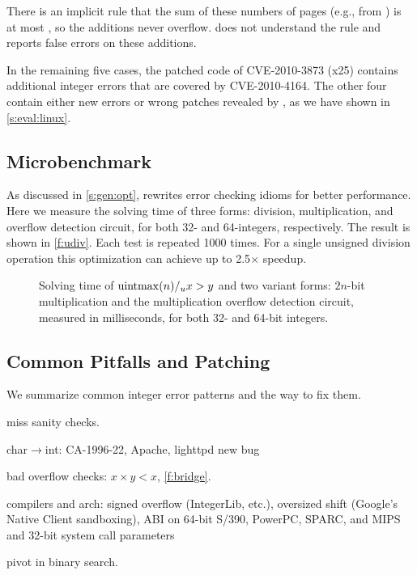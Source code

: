 There is an implicit rule that the sum of these numbers of pages
(e.g., from ) is at most , so the
additions never overflow.  \sys does not understand the rule and
reports false errors on these additions.

In the remaining five cases, the patched code of CVE-2010-3873 (x25)
contains additional integer errors that are covered by CVE-2010-4164.
The other four contain either new errors or wrong patches revealed
by \sys, as we have shown in \autoref{s:eval:linux}.

\subsection{Microbenchmark}
\label{s:eval:micro}

As discussed in \autoref{s:gen:opt}, \sys rewrites error checking
idioms for better performance.  Here we measure the solving time
of three forms: division, multiplication, and overflow detection
circuit, for both 32- and 64-integers, respectively.  The result
is shown in \autoref{f:udiv}.  Each test is repeated 1000 times.
For a single unsigned division operation this optimization can
achieve up to 2.5$\times$ speedup.

\begin{figure}
\centering

\caption{Solving time of $\operatorname{uintmax}(n) /_u x > y$ and two variant
forms: $2n$-bit multiplication and the multiplication overflow
detection circuit, measured in milliseconds, for both 32- and 64-bit
integers.}
\label{f:udiv}
\end{figure}


\subsection{Common Pitfalls and Patching}
\label{s:eval:common}

We summarize common integer error patterns and the way to fix them.


miss sanity checks.

char$\to$int: 
CA-1996-22,
Apache,
lighttpd new bug

bad overflow checks: $x \times y < x$, 
\autoref{f:bridge}.

compilers and arch:
signed overflow (IntegerLib, etc.),
oversized shift (Google's Native Client sandboxing),
ABI on 64-bit S/390, PowerPC, SPARC, and MIPS
and 32-bit system call parameters~\cite[CVE-2009-0029]{cve}

pivot in binary search.

